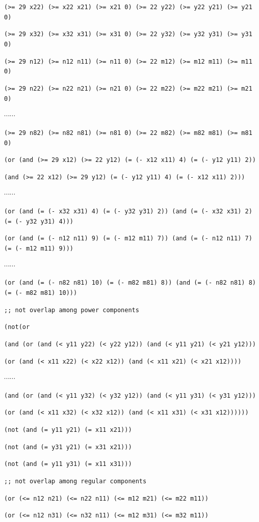 \documentclass[11pt]{article}
\begin{document}
{{{\tt (>= 29 x22) (>= x22 x21) (>= x21 0) (>= 22 y22) (>= y22 y21) (>= y21 0)}

{\tt (>= 29 x32) (>= x32 x31) (>= x31 0) (>= 22 y32) (>= y32 y31) (>= y31 0)}

{\tt (>= 29 n12) (>= n12 n11) (>= n11 0) (>= 22 m12) (>= m12 m11) (>= m11 0)}

{\tt (>= 29 n22) (>= n22 n21) (>= n21 0) (>= 22 m22) (>= m22 m21) (>= m21 0)}

$\cdots \cdots$

{\tt (>= 29 n82) (>= n82 n81) (>= n81 0) (>= 22 m82) (>= m82 m81) (>= m81 0)}

{\tt (or (and (>= 29 x12) (>= 22 y12) (= (- x12 x11) 4) (= (- y12 y11) 2))}

{\tt (and (>= 22 x12) (>= 29 y12) (= (- y12 y11) 4) (= (- x12 x11) 2)))}

$\cdots \cdots$

{\tt (or (and (= (- x32 x31) 4) (= (- y32 y31) 2)) (and (= (- x32 x31) 2) (= (- y32 y31) 4)))}

{\tt (or (and (= (- n12 n11) 9) (= (- m12 m11) 7)) (and (= (- n12 n11) 7) (= (- m12 m11) 9)))}

$\cdots \cdots$

{\tt (or (and (= (- n82 n81) 10) (= (- m82 m81) 8)) (and (= (- n82 n81) 8) (= (- m82 m81) 10)))}

{\tt ;; not overlap among power components}

{\tt (not(or}

{\tt (and (or (and (< y11 y22) (< y22 y12)) (and (< y11 y21) (< y21 y12)))}

{\tt (or (and (< x11 x22) (< x22 x12)) (and (< x11 x21) (< x21 x12))))}

$\cdots \cdots$

{\tt (and (or (and (< y11 y32) (< y32 y12)) (and (< y11 y31) (< y31 y12)))}

{\tt (or (and (< x11 x32) (< x32 x12)) (and (< x11 x31) (< x31 x12))))))}

{\tt (not (and (= y11 y21) (= x11 x21)))}

{\tt (not (and (= y31 y21) (= x31 x21)))}

{\tt (not (and (= y11 y31) (= x11 x31)))}

{\tt ;; not overlap among regular components}

{\tt (or (<= n12 n21) (<= n22 n11) (<= m12 m21) (<= m22 m11))}

{\tt (or (<= n12 n31) (<= n32 n11) (<= m12 m31) (<= m32 m11))}

}}
\end{document}
